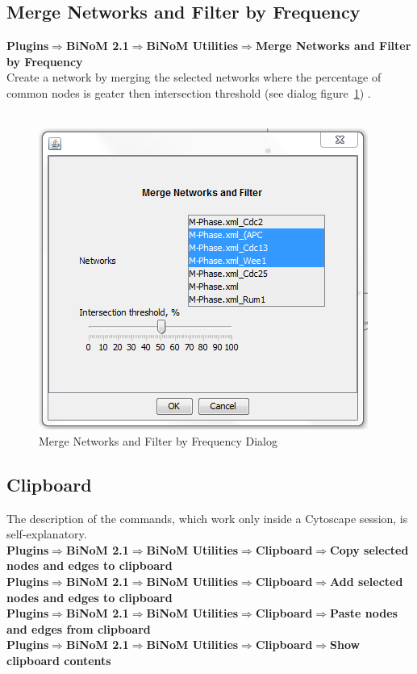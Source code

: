 \subsection{Merge Networks and Filter by Frequency}
\textbf{Plugins$\Rightarrow$BiNoM 2.1$\Rightarrow$BiNoM Utilities$\Rightarrow$Merge Networks and Filter by Frequency}\\
Create a network by merging the selected networks where the percentage of common nodes is geater then intersection threshold (see dialog figure~\ref{Merge_Networks_and_Filter}) .\\\\
\begin{figure}[h]
\centering
\includegraphics{graphics/Merge_Networks_and_Filter}
\caption{Merge Networks and Filter by Frequency Dialog}
\label{Merge_Networks_and_Filter}
\end{figure}

\subsection{Clipboard}
The description of the commands, which work only inside a Cytoscape session, is self-explanatory.\\
\textbf{Plugins$\Rightarrow$BiNoM 2.1$\Rightarrow$BiNoM Utilities$\Rightarrow$Clipboard$\Rightarrow$Copy selected nodes and edges to clipboard}\\
\textbf{Plugins$\Rightarrow$BiNoM 2.1$\Rightarrow$BiNoM Utilities$\Rightarrow$Clipboard$\Rightarrow$Add selected nodes and edges to clipboard}\\
\textbf{Plugins$\Rightarrow$BiNoM 2.1$\Rightarrow$BiNoM Utilities$\Rightarrow$Clipboard$\Rightarrow$Paste nodes and edges from clipboard}\\
\textbf{Plugins$\Rightarrow$BiNoM 2.1$\Rightarrow$BiNoM Utilities$\Rightarrow$Clipboard$\Rightarrow$Show clipboard contents}\\